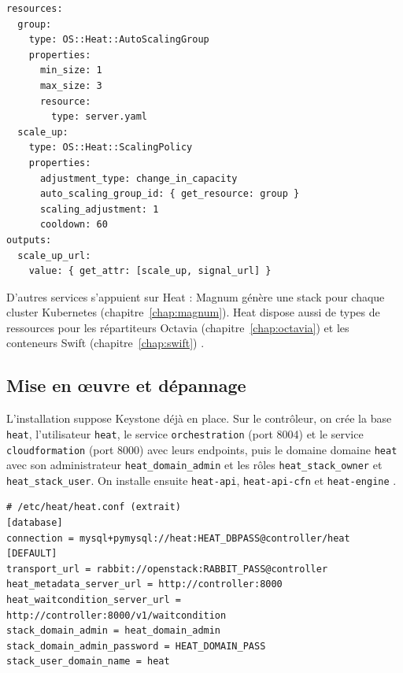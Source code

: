\par\noindent\begin{minipage}{\linewidth}
\begin{lstlisting}
resources:
  group:
    type: OS::Heat::AutoScalingGroup
    properties:
      min_size: 1
      max_size: 3
      resource:
        type: server.yaml
  scale_up:
    type: OS::Heat::ScalingPolicy
    properties:
      adjustment_type: change_in_capacity
      auto_scaling_group_id: { get_resource: group }
      scaling_adjustment: 1
      cooldown: 60
outputs:
  scale_up_url:
    value: { get_attr: [scale_up, signal_url] }
\end{lstlisting}
\end{minipage}\par

D'autres services s'appuient sur Heat : Magnum génère une stack pour chaque cluster Kubernetes (chapitre~\ref{chap:magnum}).
Heat dispose aussi de types de ressources pour les répartiteurs Octavia (chapitre~\ref{chap:octavia}) et les conteneurs Swift
(chapitre~\ref{chap:swift}) \parencite{heat-resource-types}.

\subsection{Mise en œuvre et dépannage}\label{sec:he-deploiement}

L'installation suppose Keystone déjà en place. Sur le contrôleur, on crée la base \texttt{heat}, l'utilisateur \texttt{heat}, le
service \texttt{orchestration} (port 8004) et le service \texttt{cloudformation} (port 8000) avec leurs endpoints, puis le
domaine \gls{domaine} \texttt{heat} avec son administrateur \texttt{heat\_\allowbreak domain\_\allowbreak admin} et les rôles
\texttt{heat\_\allowbreak stack\_\allowbreak owner} et \texttt{heat\_\allowbreak stack\_\allowbreak user}. On installe ensuite
\texttt{heat-api}, \texttt{heat-api-cfn} et \texttt{heat-engine} \parencite{heat-install}.

\par\noindent\begin{minipage}{\linewidth}
\begin{lstlisting}
# /etc/heat/heat.conf (extrait)
[database]
connection = mysql+pymysql://heat:HEAT_DBPASS@controller/heat
[DEFAULT]
transport_url = rabbit://openstack:RABBIT_PASS@controller
heat_metadata_server_url = http://controller:8000
heat_waitcondition_server_url = http://controller:8000/v1/waitcondition
stack_domain_admin = heat_domain_admin
stack_domain_admin_password = HEAT_DOMAIN_PASS
stack_user_domain_name = heat
\end{lstlisting}
\end{minipage}\par

